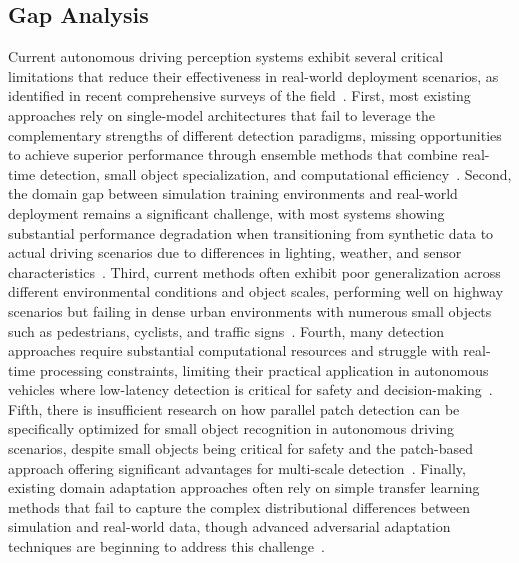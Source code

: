 \documentclass[conference]{IEEEtran}
\begin{document}
\subsection{Gap Analysis}
Current autonomous driving perception systems exhibit several critical limitations that reduce their effectiveness in real-world deployment scenarios, as identified in recent comprehensive surveys of the field~\cite{alrashoud2025comprehensive}.
First, most existing approaches rely on single-model architectures that fail to leverage the complementary strengths of different detection paradigms, missing opportunities to achieve superior performance through ensemble methods that combine real-time detection, small object specialization, and computational efficiency~\cite{zhao2024temporal}.
Second, the domain gap between simulation training environments and real-world deployment remains a significant challenge, with most systems showing substantial performance degradation when transitioning from synthetic data to actual driving scenarios due to differences in lighting, weather, and sensor characteristics~\cite{martinez2024frequency}.
Third, current methods often exhibit poor generalization across different environmental conditions and object scales, performing well on highway scenarios but failing in dense urban environments with numerous small objects such as pedestrians, cyclists, and traffic signs~\cite{white2025cross}.
Fourth, many detection approaches require substantial computational resources and struggle with real-time processing constraints, limiting their practical application in autonomous vehicles where low-latency detection is critical for safety and decision-making~\cite{nakamura2024real}.
Fifth, there is insufficient research on how parallel patch detection can be specifically optimized for small object recognition in autonomous driving scenarios, despite small objects being critical for safety and the patch-based approach offering significant advantages for multi-scale detection~\cite{garcia2025spatio}.
Finally, existing domain adaptation approaches often rely on simple transfer learning methods that fail to capture the complex distributional differences between simulation and real-world data, though advanced adversarial adaptation techniques are beginning to address this challenge~\cite{huang2024hybrid}.
\end{document}
